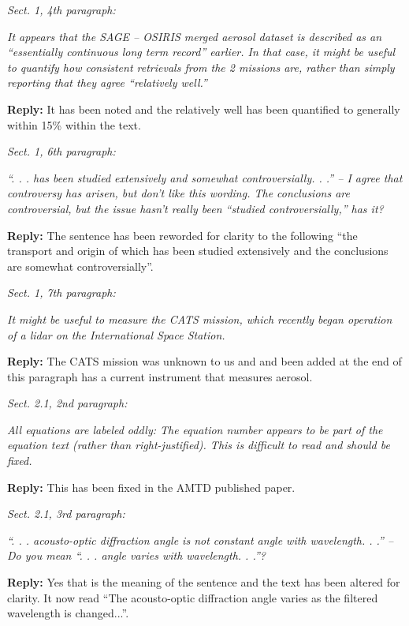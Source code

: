 \documentclass[12pt, notitlepage]{article}
\begin{document}
\textit{Sect. 1, 4th paragraph:}

\textit{It appears that the SAGE – OSIRIS merged aerosol dataset is described as an ``essentially
continuous long term record'' earlier. In that case, it might be useful to quantify
how consistent retrievals from the 2 missions are, rather than simply reporting that they
agree ``relatively well.''}

\textbf{Reply:} It has been noted and the relatively well has been quantified to generally within 15\% within the text.

\hrulefill

\textit{Sect. 1, 6th paragraph:}

\textit{``. . . has been studied extensively and somewhat controversially. . .'' – I agree that controversy
has arisen, but don't like this wording. The conclusions are controversial, but
the issue hasn't really been ``studied controversially,'' has it?}

\textbf{Reply:} The sentence has been reworded for clarity to the following ``the transport and origin of which has been
studied extensively and the conclusions are somewhat controversially''.

\hrulefill

\textit{Sect. 1, 7th paragraph:}

\textit{It might be useful to measure the CATS mission, which recently began operation of a
lidar on the International Space Station.}

\textbf{Reply:} The CATS mission was unknown to us and and been added at the end of this paragraph has a current instrument that measures aerosol.

\hrulefill

\textit{Sect. 2.1, 2nd paragraph:}

\textit{All equations are labeled oddly: The equation number appears to be part of the equation
text (rather than right-justified). This is difficult to read and should be fixed.}

\textbf{Reply:} This has been fixed in the AMTD published paper.

\hrulefill

\textit{Sect. 2.1, 3rd paragraph:}

\textit{``. . . acousto-optic diffraction angle is not constant angle with wavelength. . .'' – Do you
mean ``. . . angle varies with wavelength. . .''?}

\textbf{Reply:} Yes that is the meaning of the sentence and the text has been altered for clarity. It now read ``The acousto-optic diffraction angle varies as the filtered wavelength is changed...''.
\end{document}
